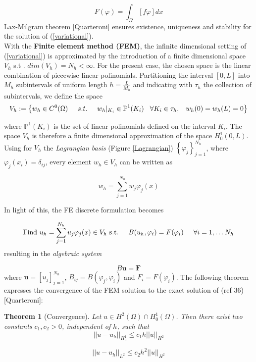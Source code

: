 \documentclass[12pt, a4paper]{article}
\newtheorem{theorem}{Theorem}[section]
\begin{document}
\begin{enumerate}
	\begin{equation}
	F(\varphi) = \int_{\Omega} \left[f \varphi\right] dx
	\end{equation}
	Lax-Milgram theorem [Quarteroni] ensures existence, uniqueness and stability for the solution of (\ref{variational}).\\
	With the \textbf{Finite element method (FEM)}, the infinite dimensional setting of (\ref{variational}) is approximated by the introduction of a finite dimensional space $V_h$ s.t . $dim(V_h) = N_h < \infty$. For the present case, the chosen space is the linear combination of piecewise linear polinomials. Partitioning the interval $[0,L]$ into $M_h$ subintervals of uniform length $ h = \frac{L}{M_h}$ and indicating with $\tau_h$ the collection of subintervals, we define the space
	$$ V_h := \left\{ w_h\in C^0(\Omega) \hspace{0.5 cm} s.t. \hspace{0.5 cm} w_h|_{K_i} \in \mathbb{P}^1(K_i) \hspace{0.3 cm} \forall K_i \in \tau_h, \hspace{0.3 cm} w_h(0)=w_h(L)=0 \right\}$$
	
	where $ \mathbb{P}^1(K_i)$ is the set of linear polinomials defined on the interval $K_i$. The space $V_h$ is therefore a finite dimensional approximation of the space $H_0^1(0,L)$. Using for $V_h$ the \textit{Lagrangian basis} (Figure \ref{Lagrangian}) $ \left\{ \varphi _j \right\}_{j=1}^{N_h}$, where $ \varphi_j(x_i) = \delta_{ij}$, every element $w_h \in V_h$ can be written as
	
	\begin{equation}
	w_h = \sum_{j=1}^{N_h} w_j \varphi_j(x)
	\end{equation}
	
	In light of this, the FE discrete formulation becomes
	
	\begin{equation}
	\text{Find $u_h = \sum_{j=1}^{N_h} u_j \varphi_j(x) \in V_h$ s.t.} \hspace{0.5cm} B(u_h,\varphi_i) = F(\varphi_i) \hspace{0.5cm} \forall i = 1, \dots N_h
	\end{equation}
	resulting in the \textit{algebraic system}
	
	\begin{equation}
	B \textbf{u} = \textbf{F} \label{algebraic}
	\end{equation}
	where $\textbf{u} = [u_j]_{j=1}^{N_h}$, $B_{ij} = B(\varphi_j,\varphi_i)$ and $F_i = F(\varphi_i)$. The following theorem expresses the convergence of the FEM solution to the exact solution of (ref 36) [Quarteroni]:
	\begin{theorem}[Convergence]
		Let $u \in H^2(\Omega) \cap H_0^1(\Omega)$. Then there exist two constants $c_1,c_2 >0$, independent of $h$, such that
		$$||u-u_h||_{H_0^1} \le c_1h||u||_{H^2}$$
		
		$$||u-u_h||_{L^2} \le c_2h^2||u||_{H^2}$$
	\end{theorem}
\end{enumerate}
\end{document}
